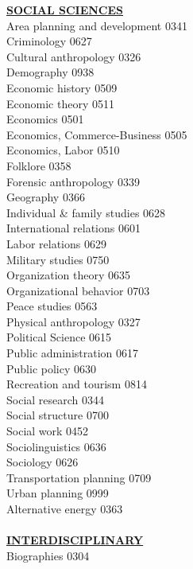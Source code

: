 \documentclass[9pt,twoside]{article}
\newcommand{\categoryheading}[1]{{\fontsize{8}{11}\selectfont \textbf{\uline{#1}}}}
\begin{document}
\begin{multicols}{3}
\categoryheading{SOCIAL SCIENCES} \\
Area planning and development \hfill 0341 \\
Criminology \hfill 0627 \\
Cultural anthropology \hfill 0326 \\
Demography \hfill 0938 \\
Economic history \hfill 0509 \\
Economic theory \hfill 0511 \\
Economics \hfill 0501 \\
Economics, Commerce-Business \hfill 0505 \\
Economics, Labor \hfill 0510 \\
Folklore \hfill 0358 \\
Forensic anthropology \hfill 0339 \\
Geography \hfill 0366 \\
Individual \& family studies \hfill 0628 \\
International relations \hfill 0601 \\
Labor relations \hfill 0629 \\
Military studies \hfill 0750 \\
Organization theory \hfill 0635 \\
Organizational behavior \hfill 0703 \\
Peace studies \hfill 0563 \\
Physical anthropology \hfill 0327 \\
Political Science \hfill 0615 \\
Public administration \hfill 0617 \\
Public policy \hfill 0630 \\
Recreation and tourism \hfill 0814 \\
Social research \hfill 0344 \\
Social structure \hfill 0700 \\
Social work \hfill 0452 \\
Sociolinguistics \hfill 0636 \\
Sociology \hfill 0626 \\
Transportation planning \hfill 0709 \\
Urban planning \hfill 0999 \\
Alternative energy \hfill 0363 \\
\columnbreak \\
\categoryheading{INTERDISCIPLINARY} \\
Biographies \hfill 0304 \\

\end{multicols}
\end{document}
